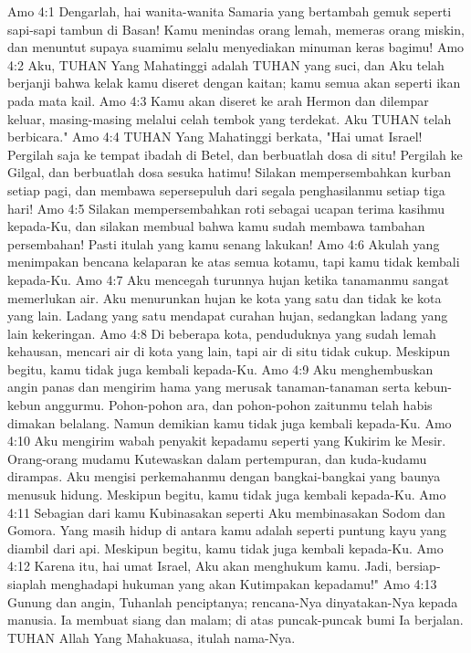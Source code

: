 Amo 4:1  Dengarlah, hai wanita-wanita Samaria yang bertambah gemuk seperti sapi-sapi tambun di Basan! Kamu menindas orang lemah, memeras orang miskin, dan menuntut supaya suamimu selalu menyediakan minuman keras bagimu!
Amo 4:2  Aku, TUHAN Yang Mahatinggi adalah TUHAN yang suci, dan Aku telah berjanji bahwa kelak kamu diseret dengan kaitan; kamu semua akan seperti ikan pada mata kail.
Amo 4:3  Kamu akan diseret ke arah Hermon dan dilempar keluar, masing-masing melalui celah tembok yang terdekat. Aku TUHAN telah berbicara."
Amo 4:4  TUHAN Yang Mahatinggi berkata, "Hai umat Israel! Pergilah saja ke tempat ibadah di Betel, dan berbuatlah dosa di situ! Pergilah ke Gilgal, dan berbuatlah dosa sesuka hatimu! Silakan mempersembahkan kurban setiap pagi, dan membawa sepersepuluh dari segala penghasilanmu setiap tiga hari!
Amo 4:5  Silakan mempersembahkan roti sebagai ucapan terima kasihmu kepada-Ku, dan silakan membual bahwa kamu sudah membawa tambahan persembahan! Pasti itulah yang kamu senang lakukan!
Amo 4:6  Akulah yang menimpakan bencana kelaparan ke atas semua kotamu, tapi kamu tidak kembali kepada-Ku.
Amo 4:7  Aku mencegah turunnya hujan ketika tanamanmu sangat memerlukan air. Aku menurunkan hujan ke kota yang satu dan tidak ke kota yang lain. Ladang yang satu mendapat curahan hujan, sedangkan ladang yang lain kekeringan.
Amo 4:8  Di beberapa kota, penduduknya yang sudah lemah kehausan, mencari air di kota yang lain, tapi air di situ tidak cukup. Meskipun begitu, kamu tidak juga kembali kepada-Ku.
Amo 4:9  Aku menghembuskan angin panas dan mengirim hama yang merusak tanaman-tanaman serta kebun-kebun anggurmu. Pohon-pohon ara, dan pohon-pohon zaitunmu telah habis dimakan belalang. Namun demikian kamu tidak juga kembali kepada-Ku.
Amo 4:10  Aku mengirim wabah penyakit kepadamu seperti yang Kukirim ke Mesir. Orang-orang mudamu Kutewaskan dalam pertempuran, dan kuda-kudamu dirampas. Aku mengisi perkemahanmu dengan bangkai-bangkai yang baunya menusuk hidung. Meskipun begitu, kamu tidak juga kembali kepada-Ku.
Amo 4:11  Sebagian dari kamu Kubinasakan seperti Aku membinasakan Sodom dan Gomora. Yang masih hidup di antara kamu adalah seperti puntung kayu yang diambil dari api. Meskipun begitu, kamu tidak juga kembali kepada-Ku.
Amo 4:12  Karena itu, hai umat Israel, Aku akan menghukum kamu. Jadi, bersiap-siaplah menghadapi hukuman yang akan Kutimpakan kepadamu!"
Amo 4:13  Gunung dan angin, Tuhanlah penciptanya; rencana-Nya dinyatakan-Nya kepada manusia. Ia membuat siang dan malam; di atas puncak-puncak bumi Ia berjalan. TUHAN Allah Yang Mahakuasa, itulah nama-Nya.
